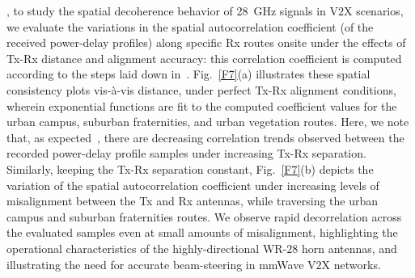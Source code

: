 \documentclass[10pt, twocolumn]{IEEEtran}
\begin{document}
, to study the spatial decoherence behavior of \SI{28}{\giga\hertz} signals in V$2$X scenarios, we evaluate the variations in the spatial autocorrelation coefficient (of the received power-delay profiles) along specific Rx routes onsite under the effects of Tx-Rx distance and alignment accuracy: this correlation coefficient is computed according to the steps laid down in~\cite{MacCartneySpatialStatistics}. Fig.~\ref{F7}(a) illustrates these spatial consistency plots vis-\`{a}-vis distance, under perfect Tx-Rx alignment conditions, wherein exponential functions are fit to the computed coefficient values for the urban campus, suburban fraternities, and urban vegetation routes. Here, we note that, as expected~\cite{MacCartneySpatialStatistics}, there are decreasing correlation trends observed between the recorded power-delay profile samples under increasing Tx-Rx separation. Similarly, keeping the Tx-Rx separation constant, Fig.~\ref{F7}(b) depicts the variation of the spatial autocorrelation coefficient under increasing levels of misalignment between the Tx and Rx antennas, while traversing the urban campus and suburban fraternities routes. We observe rapid decorrelation across the evaluated samples even at small amounts of misalignment, highlighting the operational characteristics of the highly-directional WR-$28$ horn antennas, and illustrating the need for accurate beam-steering in mmWave V$2$X networks.
\end{document}
